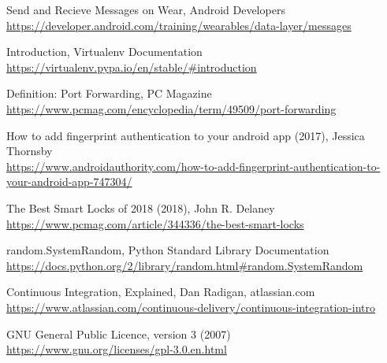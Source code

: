 \begin{thebibliography}{99}
Send and Recieve Messages on Wear, Android Developers\\
\url{https://developer.android.com/training/wearables/data-layer/messages}

Introduction, Virtualenv Documentation\\
\url{https://virtualenv.pypa.io/en/stable/#introduction}

Definition: Port Forwarding, PC Magazine\\
\url{https://www.pcmag.com/encyclopedia/term/49509/port-forwarding}

How to add fingerprint authentication to your android app (2017), Jessica Thornsby\\
\url{https://www.androidauthority.com/how-to-add-fingerprint-authentication-to-your-android-app-747304/}

The Best Smart Locks of 2018 (2018), John R. Delaney\\
\url{https://www.pcmag.com/article/344336/the-best-smart-locks}

random.SystemRandom, Python Standard Library Documentation\\
\url{https://docs.python.org/2/library/random.html#random.SystemRandom}

Continuous Integration, Explained, Dan Radigan, atlassian.com\\
\url{https://www.atlassian.com/continuous-delivery/continuous-integration-intro}

GNU General Public Licence, version 3 (2007)\\
\url{https://www.gnu.org/licenses/gpl-3.0.en.html}

\end{thebibliography}